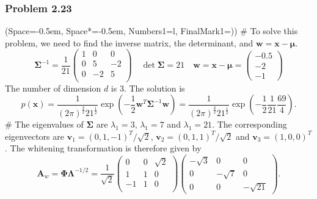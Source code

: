 \documentclass[12pt, a4paper]{article}
\newcommand{\listSpace}{-0.5em}%
\newcommand{\vect}[1]{\bm{#1}}
\begin{document}
\subsubsection*{Problem 2.23}
\begin{easylist}[enumerate]
\ListProperties(Space=\listSpace, Space*=\listSpace, Numbers1=l, FinalMark1={)})
# To solve this problem, we need to find the inverse matrix, the determinant, and $\vect{w} = \vect{x} - \vect{\mu}$.
\begin{equation*}
	\vect{\Sigma}^{-1} = \frac{1}{21}\begin{pmatrix}
	1 & 0 & 0 \\
	0 & 5 & -2 \\
	0 & -2 & 5 \\
	\end{pmatrix}
	\quad
	\det \vect{\Sigma} = 21
	\quad
	\vect{w} = \vect{x} - \vect{\mu} = 
	\begin{pmatrix}
	-0.5 \\
	-2 \\
	-1
	\end{pmatrix}
\end{equation*}
The number of dimension $d$ is 3.
The solution is
\begin{equation*}
	p(\vect{x}) = \frac{1}{\left(2 \pi \right)^\frac{3}{2} 21^{\frac{1}{2}}} \exp \left( -\frac{1}{2} \vect{w}^T \vect{\Sigma}^{-1} \vect{w}\right)
	= \frac{1}{\left(2 \pi \right)^\frac{3}{2} 21^{\frac{1}{2}}} \exp \left( -\frac{1}{2} \frac{1}{21} \frac{69}{4}\right).
\end{equation*}
# The eigenvalues of $\vect{\Sigma}$ are $\lambda_1 = 3$, $\lambda_1 = 7$ and $\lambda_1 = 21$.
The corresponding eigenvectors are
$\vect{v}_1 = (0, 1, -1)^T / \sqrt{2}$, 
$\vect{v}_2 = (0, 1, 1)^T / \sqrt{2}$ and 
$\vect{v}_3 = (1, 0, 0)^T$.
The whitening transformation is therefore given by
\begin{equation*}
	\vect{A}_w = \vect{\Phi} \vect{\Lambda}^{-1/2} = 
	\frac{1}{\sqrt{2}}
	\begin{pmatrix}
	0 & 0 & \sqrt{2} \\
	1 & 1 & 0 \\
	-1 & 1 & 0 \\
	\end{pmatrix}
	\begin{pmatrix}
	-\sqrt{3} & 0 & 0 \\
	0 & -\sqrt{7} & 0 \\
	0 & 0 & -\sqrt{21} 
	\end{pmatrix}.
\end{equation*}

\end{easylist}
\end{document}
